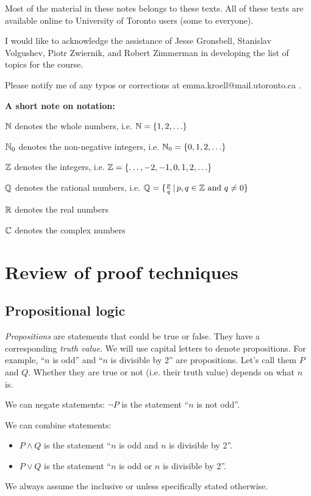 \documentclass{article}
\begin{document}
Most of the material in these notes belongs to these texts. All of these texts are available online to University of Toronto users (some to everyone).

I would like to acknowledge the assistance of Jesse Gronsbell, Stanislav Volgushev, Piotr Zwiernik, and Robert Zimmerman in developing the list of topics for the course. 

Please notify me of any typos or corrections at emma.kroell@mail.utoronto.ca .


\newpage
\tableofcontents


\newpage

{\bf A short note on notation: }

\vspace{0.5em}

${\mathbb{N}}$ denotes the whole numbers, i.e. ${\mathbb{N}} = \{1,2,\ldots \}$

${\mathbb{N}}_0$ denotes the non-negative integers, i.e. ${\mathbb{N}}_0 = \{0, 1,2,\ldots \}$

${\mathbb{Z}}$ denotes the integers, i.e. ${\mathbb{Z}} = \{ \ldots, -2,-1,0,1,2,\ldots \}$

${\mathbb{Q}}$ denotes the rational numbers, i.e. ${\mathbb{Q}} = \{ \frac{p}{q} \, | \, p, q \in {\mathbb{Z}} \text{ and } q \neq 0 \}$

${\mathbb{R}}$ denotes the real numbers

${\mathbb{C}}$ denotes the complex numbers



\section{Review of proof techniques}
\subsection{Propositional logic}

\emph{Propositions} are statements that could be true or false. They have a corresponding \emph{truth value}. We will use capital letters to denote propositions. For example, ``$n$ is odd'' and ``$n$ is divisible by 2'' are propositions. Let's call them $P$ and $Q$. Whether they are true or not (i.e. their truth value) depends on what $n$ is. 

We can  negate statements: $\neg P$ is the statement ``$n$ is not odd''.

 We can combine statements: 
 \begin{itemize}
 \item $P \wedge Q$ is the statement ``$n$ is odd and $n$ is divisible by 2''.
 \item $P \vee Q$ is the statement ``$n$ is odd or $n$ is divisible by 2''.
\end{itemize}
We always assume the inclusive or unless specifically stated otherwise.
\end{document}
